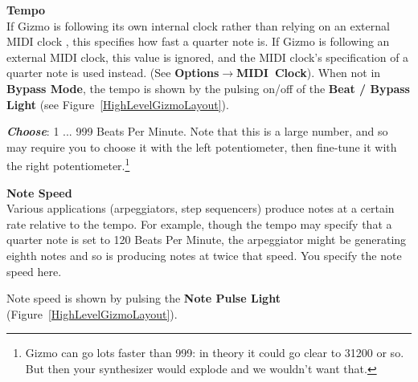 \documentclass{article}
\begin{document}
	\begin{description}


	\item{\bf Tempo}\\
	If Gizmo is following its own internal clock rather than relying on an external MIDI clock , this specifies how fast a quarter note is.  If Gizmo is following an external MIDI clock, this value is ignored, and the MIDI clock's specification of a quarter note is used instead.  (See {\bf Options\(\boldsymbol\rightarrow\)MIDI~Clock}).  When not in {\bf Bypass Mode}, the tempo is shown by the pulsing on/off of the {\bf Beat / Bypass Light} (see Figure~\ref{HighLevelGizmoLayout}). 
	
		\begin{description}
		\item{\bf \textit{Choose}}: 1 ... 999 Beats Per Minute.  Note that this is a large number, and so may require you to choose it with the left potentiometer, then fine-tune it with the right potentiometer.\footnote{Gizmo can go lots faster than 999: in theory it could go clear to 31200 or so.  But then your synthesizer would explode and we wouldn't want that.}
		\end{description}
		
	\item{\bf Note Speed}\\
		Various applications (arpeggiators, step sequencers)
		produce notes at a certain rate relative to the tempo.
		For example, though the tempo may specify that a
		quarter note is set to 120 Beats Per Minute, the 
		arpeggiator might be generating eighth notes and
		so is producing notes at twice that speed.  You specify the 
		note speed here.
		
		Note speed is shown by pulsing the {\bf Note Pulse Light} (Figure~\ref{HighLevelGizmoLayout}).


\end{description}
\end{document}
